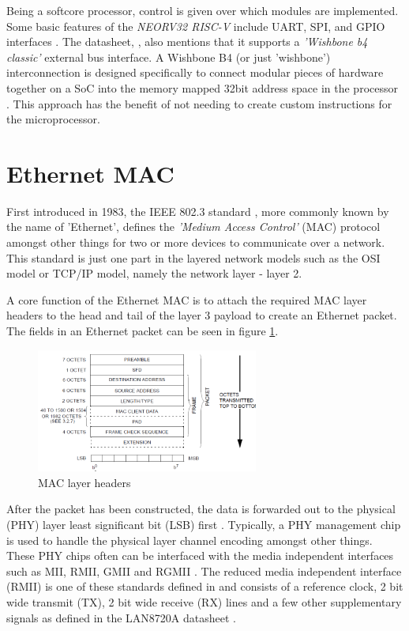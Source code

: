 Being a softcore processor, control is given over which modules are implemented. Some basic features of the \textit{NEORV32 RISC-V} include 
UART, SPI, and GPIO interfaces \cite{neorv32Datasheet}. The datasheet, \cite{neorv32Datasheet}, also mentions that it supports a \textit{'Wishbone b4 classic'} 
external bus interface. A Wishbone B4 (or just 'wishbone') interconnection is designed specifically to connect modular pieces of hardware together on a 
SoC into the memory mapped 32bit address space in the processor \cite{WishboneSpec}. This approach has the benefit of not needing to create custom 
instructions for the microprocessor. 


\section{Ethernet MAC}

First introduced in 1983, the IEEE 802.3 standard \cite{IEEE802.3-2012}, more commonly known by the name of 'Ethernet', defines the \textit{'Medium Access Control'} 
(MAC) protocol amongst other things for two or more devices to communicate over a network. This standard is just one part in the layered network 
models such as the OSI model or TCP/IP model, namely the network layer - layer 2. 


A core function of the Ethernet MAC is to attach the required MAC layer headers to the head and tail of the layer 3 payload to create an Ethernet packet. The fields 
in an Ethernet packet can be seen in figure \ref{fig:ieee-mac-headers}. 

\begin{figure}[h]
    \centering
    \includegraphics[width=0.65\textwidth]{Images/mac_packet.png}
    \caption{MAC layer headers \cite{IEEE802.3-2012}}
    \label{fig:ieee-mac-headers}
\end{figure}

After the packet has been constructed, the data is forwarded out to the physical (PHY) layer 
least significant bit (LSB) first \cite{IEEE802.3-2012}. Typically, a PHY management chip is used to handle the physical layer channel encoding amongst other things. 
These PHY chips often can be interfaced with the media independent interfaces such as MII, RMII, GMII and RGMII \cite{OptimisedEthernetMAC}. The reduced media 
independent interface (RMII) is one of these standards defined in \cite{IEEE802.3-2012} and consists of a reference clock, 2 bit wide transmit (TX), 2 bit wide 
receive (RX) lines and a few other supplementary signals as defined in the LAN8720A datasheet \cite{LAN8720ADatasheet}.


